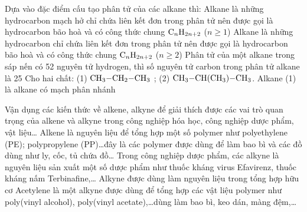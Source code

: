 \documentclass[12pt,a4paper]{article}
\begin{document}
\begin{ex}
Dựa vào đặc điểm cấu tạo phân tử của các alkane thì:
\choiceTF
{\True Alkane là những hydrocarbon mạch hở chỉ chứa liên kết đơn trong phân tử nên được gọi là hydrocarbon bão hoà và có công thức chung $\ce{C_nH_{2n+2}}$ ($n \ge 1$)}
{Alkane là những hydrocarbon chỉ chứa liên kết đơn trong phân tử nên được gọi là hydrocarbon bão hoà và có công thức chung $\ce{C_nH_{2n+2}}$ ($n \ge 2$)}
{\True Phân tử của một alkane trong sáp nến có 52 nguyên tử hydrogen, thì số nguyên tử carbon trong phân tử alkane là 25}
{Cho hai chất: (1) $\ce{CH3-CH2-CH3}$ ; (2) $\ce{CH3-CH(CH3)-CH3}$. Alkane (1) là alkane có mạch phân nhánh}
\end{ex}

\begin{ex}
Vận dụng các kiến thức về alkene, alkyne để giải thích được các vai trò quan trọng của alkene và alkyne trong công nghiệp hóa học, công nghiệp dược phẩm, vật liệu\dots
\choiceTF
{\True Alkene là nguyên liệu để tổng hợp một số polymer như polyethylene (PE); polypropylene (PP)\dots đây là các polymer được dùng để làm bao bì và các đồ dùng như ly, cốc, tủ chứa đồ\dots}
{\True Trong công nghiệp dược phẩm, các alkyne là nguyên liệu sản xuất một số dược phẩm như thuốc kháng virus Efavirenz, thuốc kháng nấm Terbinafine,\dots}
{\True Alkyne được dùng làm nguyên liệu trong tổng hợp hữu cơ}
{\True Acetylene là một alkyne được dùng để tổng hợp các vật liệu polymer như poly(vinyl alcohol), poly(vinyl acetate),\dots dùng làm bao bì, keo dán, màng đệm,\dots}
\end{ex}
\end{document}
